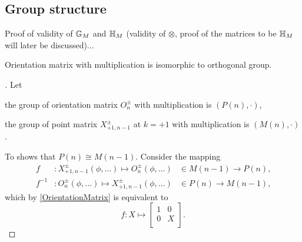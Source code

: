 \documentclass[stu, babel, american, biblatex, a4paper, draftall]{apa7}
\begin{document}
\subsection{Group structure}
Proof of validity of $\mathbb{G}_{M}$ and $\mathbb{H}_{M}$ (validity of $\otimes$, proof of the matrices to be $\mathbb{H}_{M}$ will later be discussed)...
\begin{lemma}\label{OrientationGroup}
    Orientation matrix with multiplication
    is isomorphic to orthogonal group.
\end{lemma}
\begin{proof}[]
    Let
    \begin{APAitemize}
        \item the group of orientation matrix $O^{\pm}_{n}$ with multiplication is $\left(P\left(n\right),\cdot\right)$,
        \item the group of point matrix $X^{\pm}_{+1,n-1}$ at $k=+1$ with multiplication is $\left(M\left(n\right),\cdot\right)$.
    \end{APAitemize}

    To shows that $P\left(n\right)\cong M\left(n-1\right)$.
    Consider the mapping
    \begin{align*}
        f      & : X^{\pm}_{+1,n-1}\left(\phi,\dots\right) \mapsto O^{\pm}_{n}\left(\phi,\dots\right) & \in M\left(n-1\right) \to P\left(n\right) \text{,} \\
        f^{-1} & : O^{\pm}_{n}\left(\phi,\dots\right) \mapsto X^{\pm}_{+1,n-1}\left(\phi,\dots\right) & \in P\left(n\right) \to M\left(n-1\right) \text{,}
    \end{align*}
    which by \cref{OrientationMatrix} is equivalent to
    \begin{equation} \label{PointToOrientationIsomorphism}
        f : X \mapsto \begin{bmatrix}
            1 & 0 \\
            0 & X \\
        \end{bmatrix}
        \text{.}
    \end{equation}


\end{proof}
\end{document}
